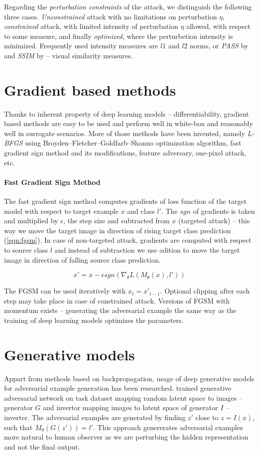 Regarding the \emph{perturbation constraints} of the attack, we distinguish the following three cases. \emph{Unconstrained} attack with no limitations on perturbation $\eta$, \emph{constrained} attack, with limited intensity of perturbation $\eta$ allowed, with respect to some measure, and finally \emph{optimized}, where the perturbetion intensity is minimized. Frequently used intensity measures are $l1$ and $l2$ norms, or \emph{PASS} by \cite{DBLP:journals/corr/RozsaRB16} and \emph{SSIM} by \cite{ssim} -- visual similarity measures.

\section{Gradient based methods}
Thanks to inherent property of deep learning models -- differentiability, gradient based methods are easy to be used and perform well in white-box and reasonably well in surrogate scenarios. More of those methods have been invented, namely \textit{L-BFGS} using Broyden–Fletcher–Goldfarb–Shanno optimization algorithm, fast gradient sign method and its modifications, feature adversary, one-pixel attack, etc.

\paragraph{Fast Gradient Sign Method}
The fast gradient sign method computes gradients of loss function of the target model  with respect to target example $x$ and class $l'$. The $sgn$ of gradients is taken and multiplied by $\epsilon$, the step size and subtracted from $x$ (targeted attack) -- this way we move the target image in direction of rising target class prediction (\ref{eqn:fgsm}). In case of non-targeted attack, gradients are computed with respect to source class $l$ and instead of subtraction we use adition to move the target image in direction of falling source class prediction.

\begin{equation} \label{eqn:fgsm}
x' = x - \epsilon sgn(\nabla_\theta L(M_\theta(x), l'))
\end{equation}

The FGSM can be used iteratively with $x_t = x'_{t-1}$. Optional clipping after each step may take place in case of constrained attack. Versions of FGSM with momentum exists -- generating the adversarial example the same way as the training of deep learning models optimizes the parameters.

\section{Generative models}
Appart from methods based on backpropagation, usage of deep generative models for adversarial example generation has been researched. \cite{gan-advex} trained generative adversarial network on task dataset mapping random latent space to images -- generator $G$ and invertor mapping images to latent space of generator $I$ -- inverter. The adversarial examples are generated by finding $z'$ close to $z = I(x)$, such that $M_\theta(G(z')) = l'$. This approach genererates adversarial examples more natural to human observer as we are perturbing the hidden representation and not the final output.
